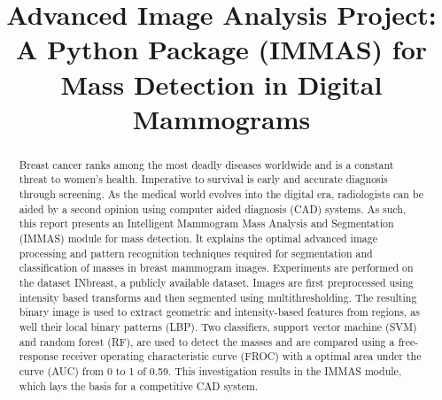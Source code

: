 \documentclass{article}
\title{Advanced Image Analysis Project: A Python Package (IMMAS) for Mass Detection in Digital Mammograms}
\begin{document}
%
\maketitle
%
\begin{abstract}
Breast cancer ranks among the most deadly diseases worldwide and is a constant threat to women's health. Imperative to survival is early and accurate diagnosis through screening. As the medical world evolves into the digital era, radiologists can be aided by a second opinion using computer aided diagnosis (CAD) systems. As such, this report presents an Intelligent Mammogram Mass Analysis and Segmentation (IMMAS) module for mass detection. It explains the optimal advanced image processing and pattern recognition techniques required for segmentation and classification of masses in breast mammogram images. Experiments are performed on the dataset INbreast, a publicly available dataset. Images are first preprocessed using intensity based transforms and then segmented using multithresholding. The resulting binary image is used to extract geometric and intensity-based features from regions, as well their local binary patterns (LBP). Two classifiers, support vector machine (SVM) and random forest (RF), are used to detect the masses and are compared using a free-response receiver operating characteristic curve (FROC) with a optimal area under the curve (AUC) from 0 to 1 of 0.59. This investigation results in the IMMAS module, which lays the basis for a competitive CAD system.
\end{abstract}

%
















\label{sec:ref}
\end{document}
